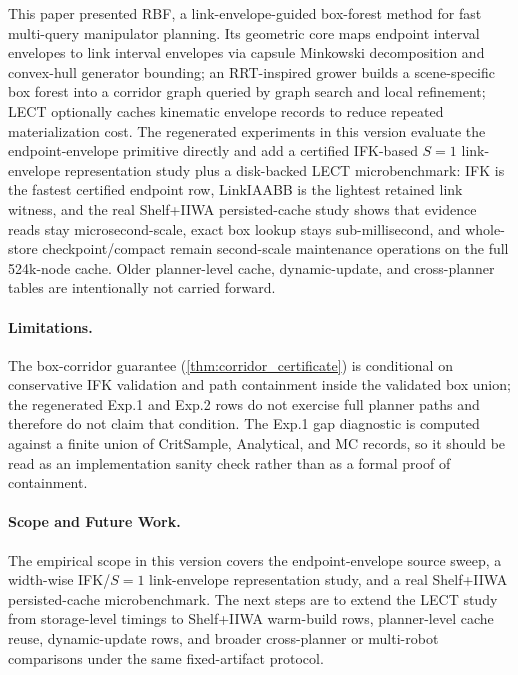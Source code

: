 \documentclass[journal]{IEEEtran}
\DeclareRobustCommand{\textsc}[1]{\textnormal{\MakeUppercase{#1}}}
\newcommand{\rbf}{\textsc{RBF}}
\begin{document}
This paper presented \rbf{}, a link-envelope-guided box-forest method for fast
multi-query manipulator planning. Its geometric core maps endpoint interval
envelopes to link interval envelopes via capsule Minkowski decomposition and
convex-hull generator bounding; an RRT-inspired grower builds a scene-specific
box forest into a corridor graph queried by graph search and local refinement;
LECT optionally caches kinematic envelope records to reduce repeated
materialization cost. The regenerated experiments in this version evaluate the
endpoint-envelope primitive directly and add a certified IFK-based $S=1$
link-envelope representation study plus a disk-backed LECT microbenchmark: IFK
is the fastest certified endpoint row, LinkIAABB is the lightest retained link
witness, and the real Shelf+IIWA persisted-cache study shows that evidence
reads stay microsecond-scale, exact box lookup stays sub-millisecond, and
whole-store checkpoint/compact remain second-scale maintenance operations on
the full 524k-node cache. Older planner-level cache,
dynamic-update, and cross-planner tables are intentionally not carried forward.

\paragraph{Limitations.}
The box-corridor guarantee (\cref{thm:corridor_certificate}) is conditional on
conservative IFK validation and path containment inside the validated box union;
the regenerated Exp.1 and Exp.2 rows do not exercise full planner paths and
therefore do not claim that condition. The Exp.1 gap diagnostic is computed
against a finite union of CritSample, Analytical, and MC records, so it should
be read as an implementation sanity check rather than as a formal proof of
containment.

\paragraph{Scope and Future Work.}
The empirical scope in this version covers the endpoint-envelope source sweep,
a width-wise IFK/$S=1$ link-envelope representation study, and a real
Shelf+IIWA persisted-cache microbenchmark. The next steps are to extend the
LECT study from storage-level timings to Shelf+IIWA warm-build rows,
planner-level cache reuse, dynamic-update rows, and broader cross-planner or multi-robot
comparisons under the same fixed-artifact protocol.



\end{document}
